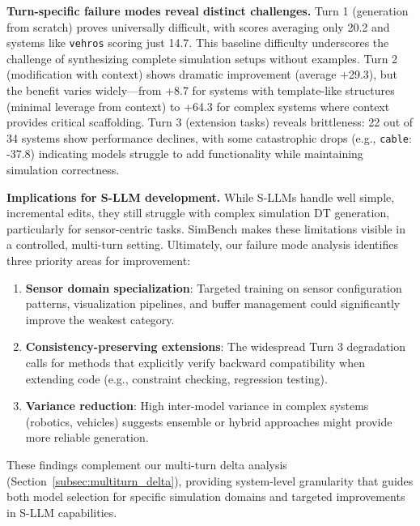 \textbf{Turn-specific failure modes reveal distinct challenges.}
Turn 1 (generation from scratch) proves universally difficult, with scores averaging only 20.2 and systems like \texttt{vehros} scoring just 14.7. This baseline difficulty underscores the challenge of synthesizing complete simulation setups without examples. Turn 2 (modification with context) shows dramatic improvement (average +29.3), but the benefit varies widely—from +8.7 for systems with template-like structures (minimal leverage from context) to +64.3 for complex systems where context provides critical scaffolding. Turn 3 (extension tasks) reveals brittleness: 22 out of 34 systems show performance declines, with some catastrophic drops (e.g., \texttt{cable}: -37.8) indicating models struggle to add functionality while maintaining simulation correctness.

\textbf{Implications for S-LLM development.}
While S-LLMs handle well simple, incremental edits, they still struggle with complex simulation DT generation, particularly for sensor-centric tasks. SimBench makes these limitations visible in a controlled, multi-turn setting. Ultimately, our failure mode analysis identifies three priority areas for improvement:

\begin{enumerate}
    \item \textbf{Sensor domain specialization}: Targeted training on sensor configuration patterns, visualization pipelines, and buffer management could significantly improve the weakest category.
    \item \textbf{Consistency-preserving extensions}: The widespread Turn 3 degradation calls for methods that explicitly verify backward compatibility when extending code (e.g., constraint checking, regression testing).
    \item \textbf{Variance reduction}: High inter-model variance in complex systems (robotics, vehicles) suggests ensemble or hybrid approaches might provide more reliable generation.
\end{enumerate}

These findings complement our multi-turn delta analysis (Section~\ref{subsec:multiturn_delta}), providing system-level granularity that guides both model selection for specific simulation domains and targeted improvements in S-LLM capabilities.

